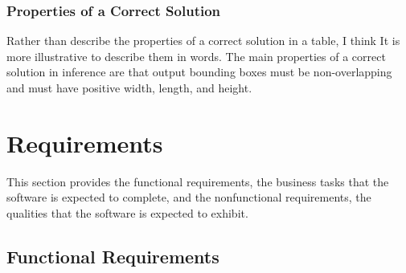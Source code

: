 \documentclass[12pt]{article}
\begin{document}
\subsubsection{Properties of a Correct Solution} \label{sec_CorrectSolution}

Rather than describe the properties of a correct solution in a table, I think It
is more illustrative to describe them in words. The main properties of a correct solution in inference
are that output bounding boxes must be non-overlapping and must have positive width, length, and height.

\section{Requirements}

This section provides the functional requirements, the business tasks that the
software is expected to complete, and the nonfunctional requirements, the
qualities that the software is expected to exhibit.

\newpage

\subsection{Functional Requirements}
\end{document}
